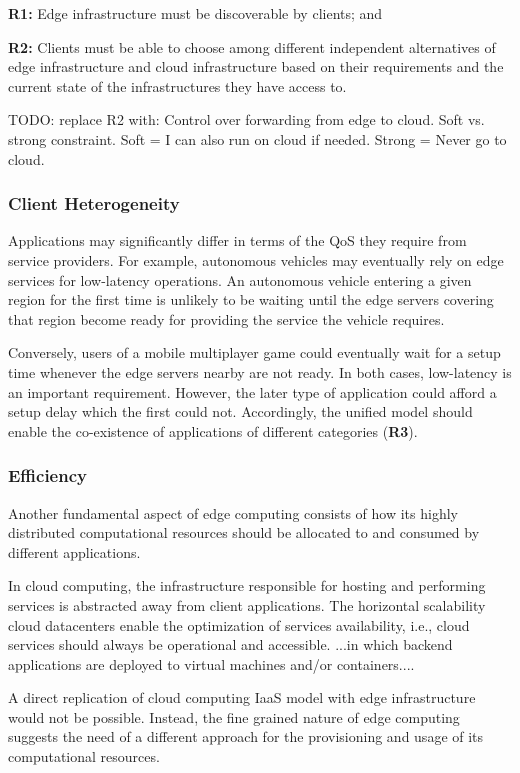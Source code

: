 \textbf{R1:} Edge infrastructure must be discoverable by clients; and 

\textbf{R2:} Clients must be able to choose among different independent alternatives of edge infrastructure and cloud infrastructure based on their requirements and the current state of the infrastructures they have access to.

TODO: replace R2 with: Control over forwarding from edge to cloud. Soft vs. strong constraint. Soft = I can also run on cloud if needed. Strong = Never go to cloud.

\subsubsection{Client Heterogeneity}

Applications may significantly differ in terms of the QoS they require from service providers. For example, autonomous vehicles may eventually rely on edge services for low-latency operations. An autonomous vehicle entering a given region for the first time is unlikely to be waiting until the edge servers covering that region become ready for providing the service the vehicle requires. 

Conversely, users of a mobile multiplayer game could eventually wait for a setup time whenever the edge servers nearby are not ready. In both cases, low-latency is an important requirement. However, the later type of application could afford a setup delay which the first could not. Accordingly, the unified model should enable the co-existence of applications of different categories (\textbf{R3}).

\subsubsection{Efficiency}

Another fundamental aspect of edge computing consists of how its highly distributed computational resources should be allocated to and consumed by different applications.

In cloud computing, the infrastructure responsible for hosting and performing services is abstracted away from client applications. The horizontal scalability cloud datacenters enable the optimization of services availability, i.e., cloud services should always be operational and accessible. ...in which backend applications are deployed to virtual machines and/or containers....

A direct replication of cloud computing IaaS model with edge infrastructure would not be possible. Instead, the fine grained nature of edge computing suggests the need of a different approach for the provisioning and usage of its computational resources. 

